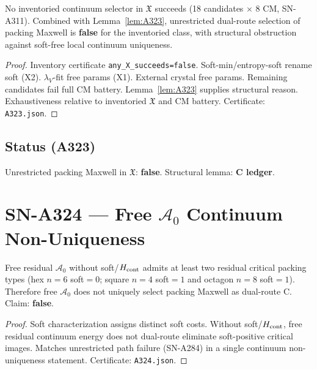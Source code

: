 \begin{theorem}
\label{thm:A323}
No inventoried continuum selector in $\mathfrak{X}$ succeeds (18 candidates $\times$ 8 CM, SN-A311). Combined with Lemma~\ref{lem:A323}, unrestricted dual-route selection of packing Maxwell is \textbf{false} for the inventoried class, with structural obstruction against soft-free local continuum uniqueness.
\end{theorem}

\begin{proof}
Inventory certificate \texttt{any\_X\_succeeds=false}. Soft-min/entropy-soft rename soft (X2). $\lambda_V$-fit free params (X1). External crystal free params. Remaining candidates fail full CM battery. Lemma~\ref{lem:A323} supplies structural reason. Exhaustiveness relative to inventoried $\mathfrak{X}$ and CM battery. Certificate: \texttt{A323.json}.
\end{proof}

\subsection*{Status (A323)}
Unrestricted packing Maxwell in $\mathfrak{X}$: \textbf{false}. Structural lemma: \textbf{C ledger}.

\section{SN-A324 --- Free $\mathcal{A}_0$ Continuum Non-Uniqueness}
\label{sec:SN-A324}

\begin{theorem}
\label{thm:A324}
Free residual $\mathcal{A}_0$ without soft/$H_{\rm cont}$ admits at least two residual critical packing types (hex $n=6$ soft$=0$; square $n=4$ soft$=1$ and octagon $n=8$ soft$=1$). Therefore free $\mathcal{A}_0$ does not uniquely select packing Maxwell as dual-route C. Claim: \textbf{false}.
\end{theorem}

\begin{proof}
Soft characterization assigns distinct soft costs. Without soft/$H_{\rm cont}$, free residual continuum energy does not dual-route eliminate soft-positive critical images. Matches unrestricted path failure (SN-A284) in a single continuum non-uniqueness statement. Certificate: \texttt{A324.json}.
\end{proof}


